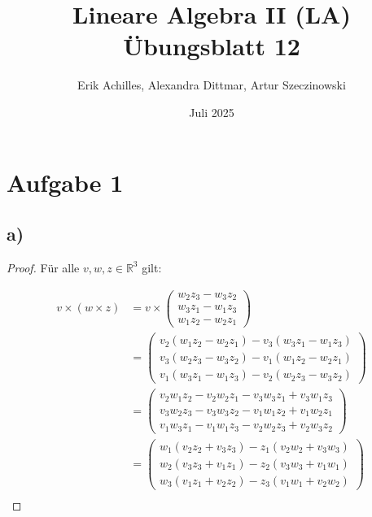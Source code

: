 \documentclass{article}
\title{Lineare Algebra II (LA) Übungsblatt 12}
\author{Erik Achilles, Alexandra Dittmar, Artur Szeczinowski}
\date{Juli 2025}
\newcommand{\RR}{\mathbb{R}}
\begin{document}
\maketitle
\newpage

\section*{Aufgabe 1}

 \subsection*{a)}
 \begin{proof}
    Für alle $v, w, z \in \RR^3$ gilt:

    \[
    \begin{aligned}
        v \times (w \times z)
        &=
        v \times
        \begin{pmatrix}
            w_2 z_3 - w_3 z_2 \\
            w_3 z_1 - w_1 z_3 \\
            w_1 z_2 - w_2 z_1
        \end{pmatrix}\\
        &=
        \begin{pmatrix}
            v_2 (w_1 z_2 - w_2 z_1) - v_3 (w_3 z_1 - w_1 z_3) \\
            v_3 (w_2 z_3 - w_3 z_2) - v_1 (w_1 z_2 - w_2 z_1) \\
            v_1 (w_3 z_1 - w_1 z_3) - v_2 (w_2 z_3 - w_3 z_2)
        \end{pmatrix} \\
        &=
        \begin{pmatrix}
            v_2 w_1 z_2 - v_2 w_2 z_1 - v_3 w_3 z_1 + v_3 w_1 z_3 \\
            v_3 w_2 z_3 - v_3 w_3 z_2 - v_1 w_1 z_2 + v_1 w_2 z_1 \\
            v_1 w_3 z_1 - v_1 w_1 z_3 - v_2 w_2 z_3 + v_2 w_3 z_2
        \end{pmatrix} \\
        &=
        \begin{pmatrix}
            w_1(v_2  z_2 + v_3  z_3) - z_1(v_2 w_2  + v_3 w_3 )  \\
            w_2(v_3  z_3 + v_1  z_1) - z_2(v_3 w_3  + v_1 w_1 )  \\
            w_3(v_1  z_1 + v_2  z_2) - z_3(v_1 w_1  + v_2 w_2 ) 
        \end{pmatrix} \\

\end{aligned}\]
\end{proof}
\end{document}
